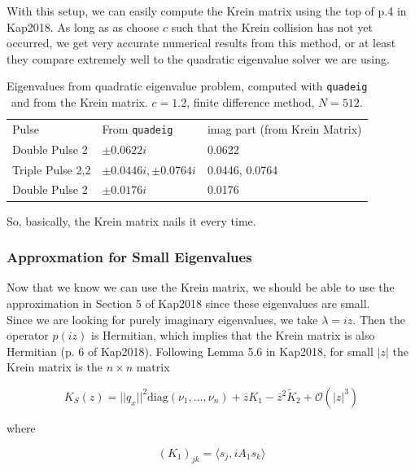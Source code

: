 \documentclass[12pt]{article}
\begin{document}
With this setup, we can easily compute the Krein matrix using the top of p.4 in Kap2018. As long as as choose $c$ such that the Krein collision has not yet occurred, we get very accurate numerical results from this method, or at least they compare extremely well to the quadratic eigenvalue solver we are using. 

\begin{table}[H]
\begin{tabular}{lll}
Pulse & From \texttt{quadeig} & imag part (from Krein Matrix) \\
Double Pulse 2    & $\pm 0.0622i$ & 0.0622 \\
Triple Pulse 2,2  & $\pm 0.0446i, \pm 0.0764i$ & 0.0446, 0.0764 \\
Double Pulse 2    & $\pm 0.0176i$ & 0.0176 \\
\end{tabular}
\caption{Eigenvalues from quadratic eigenvalue problem, computed with \texttt{quadeig} and from the Krein matrix. $c = 1.2$, finite difference method, $N = 512$. }
\end{table}

So, basically, the Krein matrix nails it every time.\\

\subsubsection{Approxmation for Small Eigenvalues}

Now that we know we can use the Krein matrix, we should be able to use the approximation in Section 5 of Kap2018 since these eigenvalues are small.\\

Since we are looking for purely imaginary eigenvalues, we take $\lambda = i z$. Then the operator $p(iz)$ is Hermitian, which implies that the Krein matrix is also Hermitian (p. 6 of Kap2018). Following Lemma 5.6 in Kap2018, for small $|z|$ the Krein matrix is the $n \times n$ matrix

\begin{equation}
K_S(z) = ||q_x||^2 \text{diag}(\nu_1, \dots, \nu_n) + \overline{z} K_1 - \overline{z}^2 \tilde{K}_2 + \mathcal{O}(|z|^3)
\end{equation}

where

\begin{equation}
(K_1)_{jk} = \langle s_j, i A_1 s_k \rangle
\end{equation}
\end{document}
